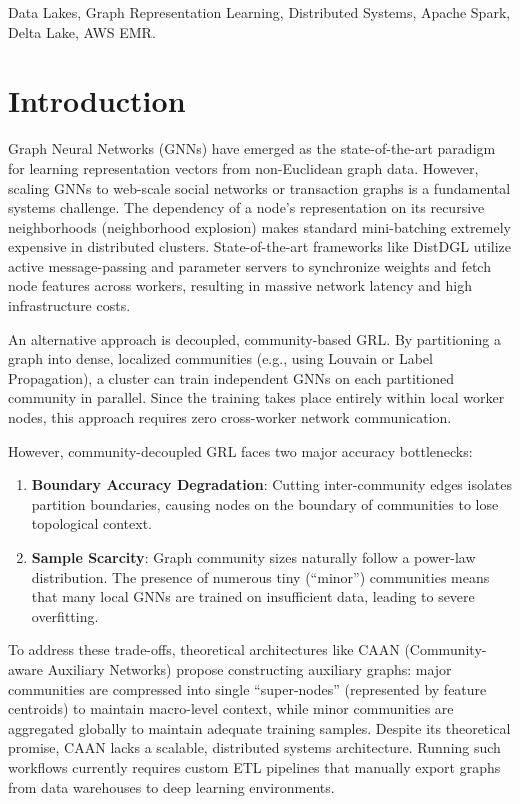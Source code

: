 \documentclass[conference,compsoc]{IEEEtran}
\begin{document}
\begin{IEEEkeywords}
Data Lakes, Graph Representation Learning, Distributed Systems, Apache Spark, Delta Lake, AWS EMR.
\end{IEEEkeywords}

\IEEEpeerreviewmaketitle

\section{Introduction}
Graph Neural Networks (GNNs) have emerged as the state-of-the-art paradigm for learning representation vectors from non-Euclidean graph data. However, scaling GNNs to web-scale social networks or transaction graphs is a fundamental systems challenge. The dependency of a node's representation on its recursive neighborhoods (neighborhood explosion) makes standard mini-batching extremely expensive in distributed clusters. State-of-the-art frameworks like DistDGL utilize active message-passing and parameter servers to synchronize weights and fetch node features across workers, resulting in massive network latency and high infrastructure costs.

An alternative approach is decoupled, community-based GRL. By partitioning a graph into dense, localized communities (e.g., using Louvain or Label Propagation), a cluster can train independent GNNs on each partitioned community in parallel. Since the training takes place entirely within local worker nodes, this approach requires zero cross-worker network communication. 

However, community-decoupled GRL faces two major accuracy bottlenecks:
\begin{enumerate}
    \item \textbf{Boundary Accuracy Degradation}: Cutting inter-community edges isolates partition boundaries, causing nodes on the boundary of communities to lose topological context.
    \item \textbf{Sample Scarcity}: Graph community sizes naturally follow a power-law distribution. The presence of numerous tiny (``minor'') communities means that many local GNNs are trained on insufficient data, leading to severe overfitting.
\end{enumerate}

To address these trade-offs, theoretical architectures like CAAN (Community-aware Auxiliary Networks) propose constructing auxiliary graphs: major communities are compressed into single ``super-nodes'' (represented by feature centroids) to maintain macro-level context, while minor communities are aggregated globally to maintain adequate training samples. Despite its theoretical promise, CAAN lacks a scalable, distributed systems architecture. Running such workflows currently requires custom ETL pipelines that manually export graphs from data warehouses to deep learning environments.
\end{document}
